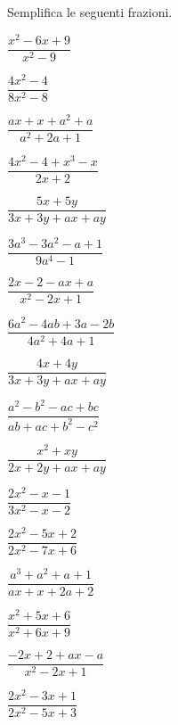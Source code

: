 \begin{esercizio}[*]
\label{ese:19.5}
Semplifica le seguenti frazioni.
\begin{htmulticols}{2}
\begin{enumeratea}
\item \(\dfrac{x^{2}-6x+9}{x^{2}-9}\)
\item \(\dfrac{4x^{2}-4}{8x^{2}-8}\)
\item \(\dfrac{ax+x+a^{2}+a}{a^{2}+2a+1}\)
\item \(\dfrac{4x^{2}-4+x^{3}-x}{2x+2}\)
\item \(\dfrac{5x+5y}{3x+3y+ax+ay}\)
\item \(\dfrac{3a^{3}-3a^{2}-a+1}{9a^{4}-1}\)
\item \(\dfrac{2x-2-ax+a}{x^{2}-2x+1}\)
\item \(\dfrac{6a^{2}-4ab+3a-2b}{4a^{2}+4a+1}\)
\item \(\dfrac{4x+4y}{3x+3y+ax+ay}\)
\item \(\dfrac{a^{2}-b^{2}-ac+bc}{ab+ac+b^{2}-c^{2}}\)
\item \(\dfrac{x^{2}+xy}{2x+2y+ax+ay}\)
\item \(\dfrac{2x^{2}-x-1}{3x^{2}-x-2}\)
\item \(\dfrac{2x^{2}-5x+2}{2x^{2}-7x+6}\)
\item \(\dfrac{a^{3}+a^{2}+a+1}{ax+x+2a+2}\)
\item \(\dfrac{x^{2}+5x+6}{x^{2}+6x+9}\)
\item \(\dfrac{-2x+2+ax-a}{x^{2}-2x+1}\)
\item \(\dfrac{2x^{2}-3x+1}{2x^{2}-5x+3}\)

\end{enumeratea}
\end{htmulticols}
\end{esercizio}
